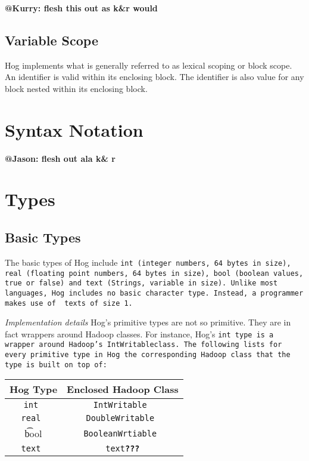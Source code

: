 \documentclass{book}
\begin{document}
\textbf{@Kurry: flesh this out as k\&r would}


\section{Variable Scope} %
\label{sec:variable_scope}

Hog implements what is generally referred to as lexical scoping or block scope. An
identifier is valid within its enclosing block. The identifier is also value for
any block nested within its enclosing block.



\chapter{Syntax Notation} %
\label{cha:syntax_notation}

\textbf{@Jason: flesh out ala k\& r}


\chapter{Types} %
\label{cha:types}

\section{Basic Types} %
\label{sec:basic_types}

The basic types of Hog include \tt int \rm (integer numbers, 64 bytes in size), \tt
real \rm (floating point numbers, 64 bytes in size), \tt bool \rm(boolean values,
true or false) and \tt text \rm (Strings, variable in size). Unlike most languages,
Hog includes no basic character type. Instead, a programmer makes use of \tt
text\rm s of size 1.

\emph{Implementation details} Hog’s primitive types are not so primitive. They are
in fact wrappers around Hadoop classes. For instance, Hog’s \tt int \rm type is a
wrapper around Hadoop's \tt IntWritableclass\rm. The following lists for every
primitive type in Hog the corresponding Hadoop class that the type is built on top
of:

\begin{center}
\begin{tabular}{|c|c|}
    \hline
\textbf{Hog Type} & \textbf{Enclosed Hadoop Class} \\ \hline
\tt int & \tt IntWritable \\ \hline
\tt real & \tt DoubleWritable \\ \hline
\t bool & \tt BooleanWrtiable \\ \hline
\tt text & \tt text\textbf{???}\rm \\ \hline
\end{tabular}
\end{center}
\end{document}
